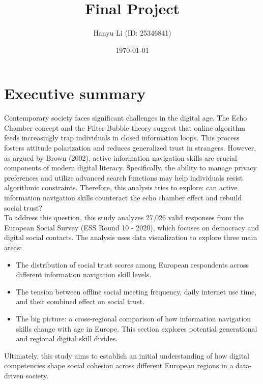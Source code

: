 \documentclass[12pt,letterpaper]{article}
\title{\textbf{Final Project}}
\date{\today}
\author{Hanyu Li (ID: 25346841)}
\begin{document}
	
	\maketitle
	
	\tableofcontents
	\newpage 
	
	\section*{Executive summary}
	
	Contemporary society faces significant challenges in the digital age. The Echo Chamber concept and the Filter Bubble theory suggest that online algorithm feeds increasingly trap individuals in closed information loops. This process fosters attitude polarization and reduces generalized trust in strangers. However, as argued by Brown (2002), active information navigation skills are crucial components of modern digital literacy. Specifically, the ability to manage privacy preferences and utilize advanced search functions may help individuals resist algorithmic constraints. Therefore, this analysis tries to explore: can active information navigation skills counteract the echo chamber effect and rebuild social trust?\\
	
	To address this question, this study analyzes 27,026 valid responses from the European Social Survey (ESS Round 10 - 2020), which focuses on democracy and digital social contacts. The analysis uses data visualization to explore three main areas:\\
	
	\begin{itemize}
		\item The distribution of social trust scores among European respondents across different information navigation skill levels.
		\item The tension between offline social meeting frequency, daily internet use time, and their combined effect on social trust.
		\item The big picture: a cross-regional comparison of how information navigation skills change with age in Europe. This section explores potential generational and regional digital skill divides.
	\end{itemize}
	
	Ultimately, this study aims to establish an initial understanding of how digital competencies shape social cohesion across different European regions in a data-driven society.\\
	
\end{document}
